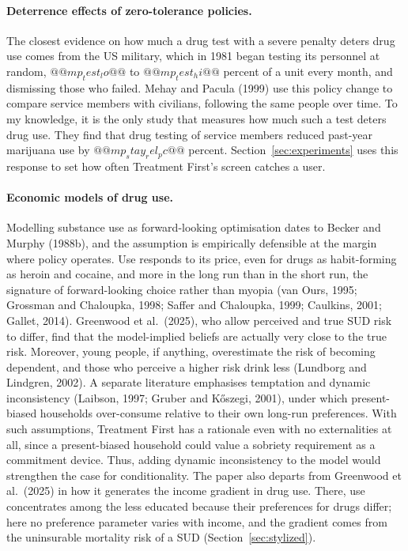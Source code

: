 \documentclass[10pt]{article}
\begin{document}
\paragraph{Deterrence effects of zero-tolerance policies.} The closest evidence on how much a drug test with a severe penalty deters drug use comes from the US military, which in 1981 began testing its personnel at random, $@@mp_test_lo@@$ to $@@mp_test_hi@@$ percent of a unit every month, and dismissing those who failed. Mehay and Pacula (1999) use this policy change to compare service members with civilians, following the same people
over time. To my knowledge, it is the only study that measures how much such a test deters drug use.    They find that drug testing of service members reduced past-year marijuana use by $@@mp_stay_rel_pc@@$ percent.  Section~\ref{sec:experiments} uses this response to set how often Treatment First's screen catches a user.

\paragraph{Economic models of drug use.} Modelling substance use as forward-looking
optimisation dates to Becker and Murphy (1988b), and the assumption is empirically
defensible at the margin where policy operates. Use responds to its price, even for drugs as habit-forming as heroin and cocaine, and more in the long run than in the short run, the signature of forward-looking choice rather than myopia (van Ours, 1995; Grossman and Chaloupka, 1998; Saffer and Chaloupka, 1999; Caulkins, 2001; Gallet, 2014). Greenwood et al.\ (2025), who allow perceived and true SUD risk to differ, find that the model-implied beliefs are actually very close to the true risk. Moreover, young people, if anything, overestimate the risk of becoming dependent, and those who perceive a higher risk drink less (Lundborg and Lindgren, 2002). A separate literature emphasises temptation and dynamic
inconsistency (Laibson, 1997; Gruber and K\H{o}szegi, 2001), under which
present-biased households over-consume relative to their own long-run preferences. With such assumptions, Treatment First has a rationale even with no externalities at all, since a present-biased household could value a sobriety requirement as a commitment device.   Thus, adding dynamic inconsistency to the model would strengthen the case for conditionality. The paper also departs from Greenwood et al.\ (2025) in how it generates the income gradient in drug use. There, use concentrates among the less educated because their preferences for drugs differ; here no preference parameter varies with income, and the gradient comes from the uninsurable mortality risk of a SUD (Section~\ref{sec:stylized}).
\end{document}
